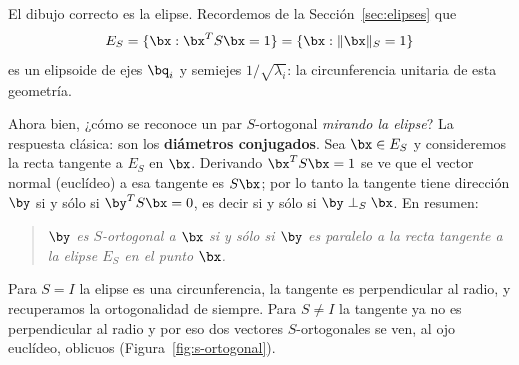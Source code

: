El dibujo correcto es la elipse. Recordemos de la
Sección~\ref{sec:elipses} que
\[
E_S=\{\bx : \bx^TS\bx=1\}=\{\bx : \|\bx\|_S=1\}
\]
es un elipsoide de ejes $\bq_i$ y semiejes $1/\sqrt{\lambda_i}$: la
circunferencia unitaria de esta geometría.

Ahora bien, ¿cómo se reconoce un par $S$-ortogonal \emph{mirando la elipse}?
La respuesta clásica: son los \textbf{diámetros conjugados}. Sea $\bx\in E_S$
y consideremos la recta tangente a $E_S$ en $\bx$. Derivando
$\bx^TS\bx=1$ se ve que el vector normal (euclídeo) a esa tangente es
$S\bx$; por lo tanto la tangente tiene dirección $\by$ si y sólo si
$\by^TS\bx=0$, es decir si y sólo si $\by\perp_S\bx$. En resumen:

\begin{quote}
\emph{$\by$ es $S$-ortogonal a $\bx$ si y sólo si $\by$ es paralelo a la
recta tangente a la elipse $E_S$ en el punto $\bx$.}
\end{quote}

Para $S=I$ la elipse es una circunferencia, la tangente es perpendicular al
radio, y recuperamos la ortogonalidad de siempre. Para $S\neq I$ la tangente
ya no es perpendicular al radio y por eso dos vectores $S$-ortogonales se
ven, al ojo euclídeo, oblicuos (Figura~\ref{fig:s-ortogonal}).

